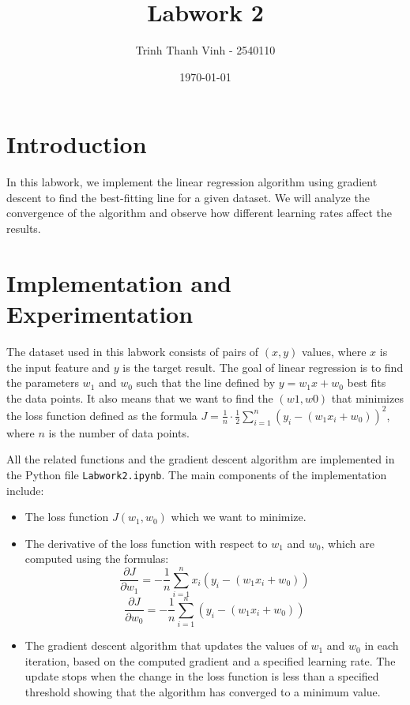 \documentclass[12pt]{article}
\title{Labwork 2}
\author{Trinh Thanh Vinh - 2540110}
\date{\today}
\begin{document}
\maketitle

\section{Introduction}
In this labwork, we implement the linear regression algorithm using gradient descent to find the best-fitting line for a given dataset. We will analyze the convergence of the algorithm and observe how different learning rates affect the results.
\section{Implementation and Experimentation}
The dataset used in this labwork consists of pairs of \( (x, y) \) values, where \( x \) is the input feature and \( y \) is the target result. The goal of linear regression is to find the parameters \( w_1 \) and \( w_0 \) such that the line defined by \( y = w_1 x + w_0 \) best fits the data points. It also means that we want to find the \((w1, w0)\) that minimizes the loss function defined as the formula \( J = \frac{1}{n} \cdot \frac{1}{2} \sum_{i=1}^{n} (y_i - (w_1 x_i + w_0))^2 \), where \( n \) is the number of data points.

All the related functions and the gradient descent algorithm are implemented in the Python file \texttt{Labwork2.ipynb}. The main components of the implementation include:

\begin{itemize}
    \item The loss function \( J(w_1, w_0) \) which we want to minimize.

    \item The derivative of the loss function with respect to \( w_1 \) and \( w_0 \), which are computed using the formulas:
    \[
    \frac{\partial J}{\partial w_1} = -\frac{1}{n} \sum_{i=1}^{n} x_i (y_i - (w_1 x_i + w_0))
    \]
    \[
    \frac{\partial J}{\partial w_0} = -\frac{1}{n} \sum_{i=1}^{n} (y_i - (w_1 x_i + w_0))
    \]

    \item The gradient descent algorithm that updates the values of \( w_1 \) and \( w_0 \) in each iteration, based on the computed gradient and a specified learning rate. The update stops when the change in the loss function is less than a specified threshold showing that the algorithm has converged to a minimum value.
\end{itemize}
\end{document}

